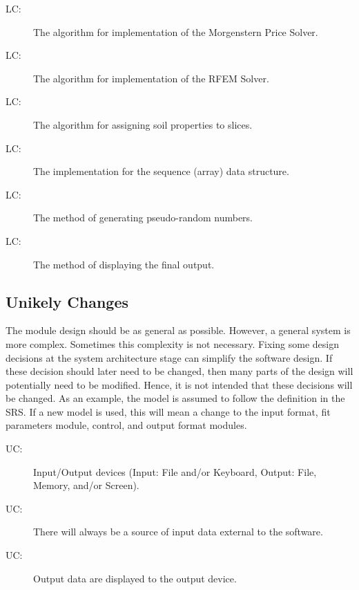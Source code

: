 \documentclass[12pt]{article}
\newcounter{lcnum}
\newcommand{\lcthelcnum}{LC\thelcnum}
\newcounter{ucnum}
\newcommand{\uctheucnum}{UC\theucnum}
\begin{document}
\begin{description}
\item[\lcthelcnum\label{LCmp}:]The algorithm for implementation of the Morgenstern Price Solver.
\end{description}
\begin{description}
\item[\lcthelcnum\label{LCrfem}:]The algorithm for implementation of the RFEM Solver.
\end{description}
\begin{description}
\item[\lcthelcnum\label{LCprop}:]The algorithm for assigning soil properties to slices.
\end{description}
\begin{description}
\item[\lcthelcnum\label{LCarray}:]The implementation for the sequence (array) data structure.
\end{description}
\begin{description}
\item[\lcthelcnum\label{LCrand}:]The method of generating pseudo-random numbers.
\end{description}
\begin{description}
\item[\lcthelcnum\label{LCplot}:]The method of displaying the final output.
\end{description}
\subsection{Unikely Changes}
\label{Sec:UC}
The module design should be as general as possible. However, a general system is more complex. Sometimes this complexity is not necessary. Fixing some design decisions at the system architecture stage can simplify the software design. If these decision should later need to be changed, then many parts of the design will potentially need to be modified. Hence, it is not intended that these decisions will be changed.  As an example, the model is assumed to follow the definition in the SRS.  If a new model is used, this will mean a change to the input format, fit parameters module, control, and output format modules.
\begin{description}
\item[\uctheucnum\label{UCIO}:]Input/Output devices (Input: File and/or Keyboard, Output: File, Memory, and/or Screen).
\end{description}
\begin{description}
\item[\uctheucnum\label{UCinputsource}:]There will always be a source of input data external to the software.
\end{description}
\begin{description}
\item[\uctheucnum\label{UCoutput}:]Output data are displayed to the output device.
\end{description}
\end{document}
